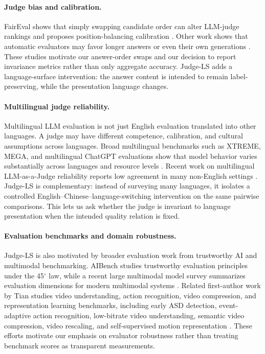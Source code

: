 \documentclass[10pt,twocolumn]{article}
\begin{document}
\paragraph{Judge bias and calibration.}
FairEval shows that simply swapping candidate order can alter LLM-judge rankings and proposes position-balancing calibration \cite{wang2024fair}. Other work shows that automatic evaluators may favor longer answers or even their own generations \cite{dubois2024lengthcontrolled,panickssery2024selfpreference}. These studies motivate our answer-order swaps and our decision to report invariance metrics rather than only aggregate accuracy. Judge-LS adds a language-surface intervention: the answer content is intended to remain label-preserving, while the presentation language changes.

\paragraph{Multilingual judge reliability.}
Multilingual LLM evaluation is not just English evaluation translated into other languages. A judge may have different competence, calibration, and cultural assumptions across languages. Broad multilingual benchmarks such as XTREME, MEGA, and multilingual ChatGPT evaluations show that model behavior varies substantially across languages and resource levels \cite{hu2020xtreme,bang2023multitask,lai2023chatgpt,ahuja2023mega}. Recent work on multilingual LLM-as-a-Judge reliability reports low agreement in many non-English settings \cite{fu2025reliable}. Judge-LS is complementary: instead of surveying many languages, it isolates a controlled English--Chinese--language-switching intervention on the same pairwise comparisons. This lets us ask whether the judge is invariant to language presentation when the intended quality relation is fixed.

\paragraph{Evaluation benchmarks and domain robustness.}
Judge-LS is also motivated by broader evaluation work from trustworthy AI and multimodal benchmarking. AIBench studies trustworthy evaluation principles under the 45$^\circ$ law, while a recent large multimodal model survey summarizes evaluation dimensions for modern multimodal systems \cite{aibench2025,zhang2025large}. Related first-author work by Tian studies video understanding, action recognition, video compression, and representation learning benchmarks, including early ASD detection, event-adaptive action recognition, low-bitrate video understanding, semantic video compression, video rescaling, and self-supervised motion representation \cite{tian2019asd,tian2022ean,tian2024lowbitrate,tian2023nonsemantics,tian2023clsa,tian2021selfconditioned,tian2020motion,tian2025smcpp}. These efforts motivate our emphasis on evaluator robustness rather than treating benchmark scores as transparent measurements.
\end{document}
